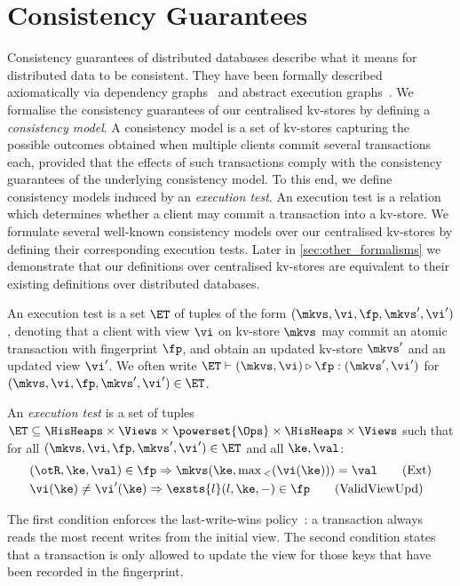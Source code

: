 \section{Consistency Guarantees}
\label{sec:cm}
Consistency guarantees of distributed databases describe
what it means for distributed data to be consistent. 
They have been formally described axiomatically via dependency graphs~\cite{adya-icde,adya}
and abstract execution graphs~\cite{ev_transactions,framework-concur}. 
We formalise the consistency guarantees of our centralised kv-stores by defining a 
\emph{consistency model}. 
A consistency model is a set of kv-stores capturing the possible outcomes 
obtained when multiple clients commit several transactions each, 
provided that the effects of such transactions comply with the consistency guarantees of the underlying consistency model. 
To this end, we define consistency models induced by an \emph{execution test}.
An execution test is a relation which determines whether a client may commit a transaction into a kv-store.  
We formulate several well-known consistency models over our centralised kv-stores 
by defining their corresponding execution tests. 
Later in \cref{sec:other_formalisms} we demonstrate that our definitions over centralised kv-stores are equivalent 
to their existing definitions over distributed databases.




An execution test is a set $\ET$ of tuples of the form $(\mkvs, \vi, \fp, \mkvs', \vi')$,
denoting that a client with view $\vi$ on kv-store $\mkvs$  may commit an atomic transaction 
with fingerprint $\fp$, and obtain an updated kv-store \( \mkvs' \) and an updated view $\vi'$. 
We often write
$\ET \vdash (\mkvs, \vi) \triangleright \fp: ( \mkvs', \vi')$ for
$(\mkvs, \vi, \fp, \mkvs', \vi') \in \ET$.


\begin{definition}
\label{def:execution.test}
An \emph{execution test} is a set of tuples $\ET \subseteq \HisHeaps \times \Views \times \powerset{\Ops} \times \HisHeaps \times \Views$ 
such that for all $(\mkvs, \vi, \fp, \mkvs', \vi') \in \ET$ and all $\ke, \val$:
%
{%
\begin{align}
\small
    & 
	(\otR, \ke, \val) \in \fp \Rightarrow
	\mkvs(\ke, \max{}_{<}(\vi(\ke))) = \val  
	\tag{Ext} \label{eq:read-external} \\
    & 
    \vi(\ke) \neq \vi'(\ke) 
    \Rightarrow
    \exsts{l} (l, \ke, -) \in \fp
    \tag{ValidViewUpd} \label{eq:valid-view-update}
\end{align}%
}%
\end{definition}
%
\noindent 
The first condition enforces the last-write-wins policy~\cite{vogels:2009:ec:1435417.1435432}: 
a transaction always reads the most recent writes from the initial view.  
The second condition states that a transaction is only allowed to update the view for those keys 
that have been recorded in the fingerprint.  

